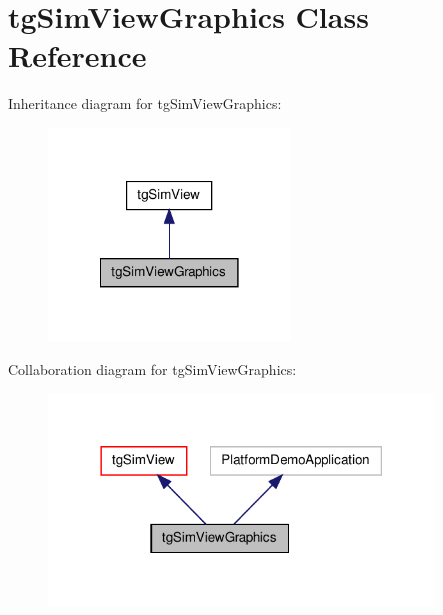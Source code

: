 \hypertarget{classtg_sim_view_graphics}{\section{tg\-Sim\-View\-Graphics Class Reference}
\label{classtg_sim_view_graphics}
}


Inheritance diagram for tg\-Sim\-View\-Graphics\-:\nopagebreak
\begin{figure}[H]
\begin{center}
\leavevmode
\includegraphics[width=182pt]{classtg_sim_view_graphics__inherit__graph}
\end{center}
\end{figure}


Collaboration diagram for tg\-Sim\-View\-Graphics\-:\nopagebreak
\begin{figure}[H]
\begin{center}
\leavevmode
\includegraphics[width=290pt]{classtg_sim_view_graphics__coll__graph}
\end{center}
\end{figure}
